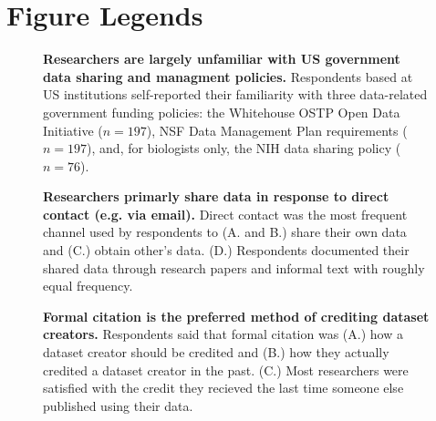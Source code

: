 \section*{Figure Legends}

\begin{figure}[!ht]
\begin{center}
\end{center}
\caption{
{\bf Researchers are largely unfamiliar with US government data sharing and managment policies.}
Respondents based at US institutions self-reported their familiarity with three data-related government funding policies: the Whitehouse OSTP Open Data Initiative ($n=197$), NSF Data Management Plan requirements ($n=197$), and, for biologists only, the NIH data sharing policy ($n=76$).
}
\label{fig:policy_knowledge}
\end{figure}

\begin{figure}[!ht]
\begin{center}
\end{center}
\caption{
{\bf Researchers primarly share data in response to direct contact (e.g. via email).}
Direct contact was the most frequent channel used by respondents to (A. and B.) share their own data and (C.) obtain other's data.
(D.) Respondents documented their shared data through research papers and informal text with roughly equal frequency.
}
\label{fig:sharing}
\end{figure}

\begin{figure}[!ht]
\begin{center}
\end{center}
\caption{
{\bf Formal citation is the preferred method of crediting dataset creators.}
Respondents said that formal citation was (A.) how a dataset creator should be credited and (B.) how they actually credited a dataset creator in the past.
(C.) Most researchers were satisfied with the credit they recieved the last time someone else published using their data.
} 
\label{fig:credit}
\end{figure}



